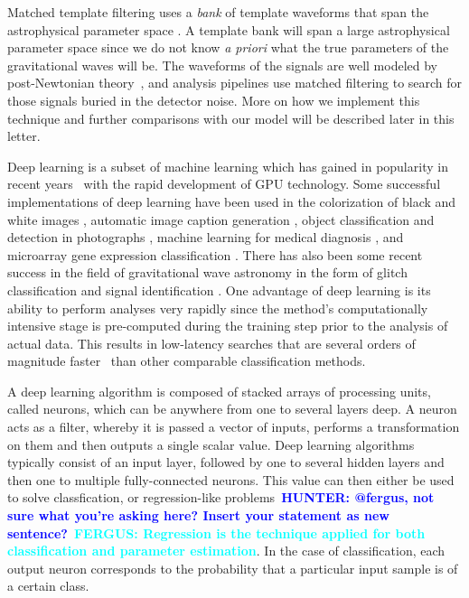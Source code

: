 \documentclass[%
 amsmath,amssymb,
 aps,
 twocolumn,
 prl,
 reprint,
floatfix,
]{revtex4-1}
\newcommand{\hunter}[1]{\textbf{\textcolor{blue}{HUNTER: #1}}}
\newcommand{\fergus}[1]{\textbf{\textcolor{cyan}{FERGUS: #1}}}
\begin{document}
%
%
Matched template filtering uses a \textit{bank} of template waveforms that span
the astrophysical parameter space \cite{PhysRevD.44.3819, PhysRevD.49.1707,
PhysRevD.53.6749, PhysRevD.60.022002, 0264-9381-23-18-002, PhysRevD.80.104014, Blanchet2014, PhysRevD.89.061502}. A template bank will span a large astrophysical parameter space since we do not
know \textit{a priori} what the true parameters of the gravitational waves will
be. The waveforms of the signals are well modeled by post-Newtonian
theory~\cite{PhysRevD.84.049901,PhysRevD.80.084043,Blanchet2014,PhysRevD.93.084054},
and analysis pipelines use matched filtering to search for those signals buried
in the detector noise. More on how we implement this technique and further
comparisons with our model will be described later in this letter.

%
%
Deep learning is a subset of machine learning which has gained in popularity in
recent years~\cite{NIPS2012_4824, 1406.2661, 1409.1556, 1412.7062, 1311.2901,
1409.4842} with the rapid development of \ac{GPU} technology. Some successful
implementations of deep learning have been used in the colorization of black
and white images \cite{1603.08511}, automatic image caption generation
\cite{1412.2306}, object classification and detection in photographs
\cite{NIPS2012_4824}, machine learning for medical diagnosis \cite{KONONENKO200189}, and microarray gene expression classification \cite{Pirooznia2008}. There has also been some recent success in the field of gravitational wave astronomy in the form of glitch classification \cite{0264-9381-34-6-064003,1706.07446} and signal identification \cite{1701.00008}. One
advantage of deep learning is its ability to perform analyses very rapidly
since the method's computationally intensive stage is pre-computed during the
training step prior to the analysis of actual data. This results in low-latency
searches that are several orders of magnitude faster~\cite{726791} than other
comparable classification methods. 

%
%
A deep learning algorithm is composed of stacked arrays of processing units, called
neurons, which can be anywhere from one to several layers deep. A neuron acts
as a filter, whereby it is passed a vector of inputs, performs a transformation
on them and then outputs a single scalar value. Deep learning algorithms
typically consist of an input layer, followed by one to several hidden layers
and then one to multiple fully-connected neurons. This value
can then either be used to solve classfication, or regression-like problems~\hunter{@fergus, not sure what you're asking here? Insert your statement as new sentence?}~\fergus{Regression is the technique applied for both classification and parameter estimation}. In
the case of classification, each output neuron corresponds to the probability
that a particular input sample is of a certain class.
\end{document}
